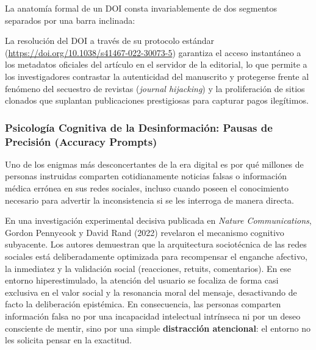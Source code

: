 La anatomía formal de un DOI consta invariablemente de dos segmentos separados por una barra inclinada:
\begin{center}
\vspace{0.15cm}
\vspace{0.15cm}
\end{center}
La resolución del DOI a través de su protocolo estándar (\url{https://doi.org/10.1038/s41467-022-30073-5}) garantiza el acceso instantáneo a los metadatos oficiales del artículo en el servidor de la editorial, lo que permite a los investigadores contrastar la autenticidad del manuscrito y protegerse frente al fenómeno del secuestro de revistas (\textit{journal hijacking}) y la proliferación de sitios clonados que suplantan publicaciones prestigiosas para capturar pagos ilegítimos.

\subsubsection{Psicología Cognitiva de la Desinformación: Pausas de Precisión (Accuracy Prompts)}

Uno de los enigmas más desconcertantes de la era digital es por qué millones de personas instruidas comparten cotidianamente noticias falsas o información médica errónea en sus redes sociales, incluso cuando poseen el conocimiento necesario para advertir la inconsistencia si se les interroga de manera directa.

En una investigación experimental decisiva publicada en \textit{Nature Communications}, Gordon Pennycook y David Rand (2022) revelaron el mecanismo cognitivo subyacente. Los autores demuestran que la arquitectura sociotécnica de las redes sociales está deliberadamente optimizada para recompensar el enganche afectivo, la inmediatez y la validación social (reacciones, retuits, comentarios). En ese entorno hiperestimulado, la atención del usuario se focaliza de forma casi exclusiva en el valor social y la resonancia moral del mensaje, desactivando de facto la deliberación epistémica. En consecuencia, las personas comparten información falsa no por una incapacidad intelectual intrínseca ni por un deseo consciente de mentir, sino por una simple \textbf{distracción atencional}: el entorno no les solicita pensar en la exactitud.

